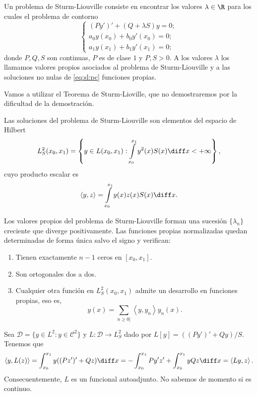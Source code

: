 \documentclass{article}
\begin{document}
\begin{definition}
  Un problema de Sturm-Liouville consiste en encontrar los valores $\lambda \in \R$ para los cuales
  el problema de contorno
  \begin{equation}
    \label{eq:sl:pc}
    \begin{cases}
      (Py')' + (Q + \lambda S) y = 0; \\
      a_0 y(x_0) + b_0 y'(x_0) = 0; \\
      a_1 y(x_1) + b_1 y'(x_1) = 0;
    \end{cases}
    \tag{SL}
  \end{equation}
  donde $P, Q, S$ son continuas, $P$ es de clase $1$ y $P, S > 0$.  A los valores $\lambda$ los
  llamamos valores propios asociados al problema de Sturm-Liouville y a las soluciones no nulas de
  \eqref{eq:sl:pc} funciones propias.
\end{definition}

Vamos a utilizar el Teorema de Sturm-Lioville, que no demostraremos por la dificultad de la
demostración.

Las soluciones del problema de Sturm-Liouville son elementos del espacio de Hilbert
\[L^{2}_S(x_0, x_1) = \left\{y \in L(x_0, x_1): \int\limits_{x_0}^{x_1} y^2(x) S(x) \diff x <
    +\infty\right\},\]
cuyo producto escalar es
\[\left\langle y, z \right\rangle = \int\limits_{x_0}^{x_1} y(x) z(x) S(x) \diff x.\]

\begin{theorem}
  \label{thm:sl}
  Los valores propios del problema de Sturm-Liouville forman una sucesión $\{\lambda_n\}$ creciente
  que diverge positivamente. Las funciones propias normalizadas quedan determinadas de forma única
  salvo el signo y verifican:
  \begin{enumerate}
  \item\label{item:sl:a} Tienen exactamente $n-1$ ceros en $[x_0, x_1]$.
  \item\label{item:sl:b} Son ortogonales dos a dos.
  \item\label{item:sl:c} Cualquier otra función en $L^{2}_S(x_0, x_1)$ admite un desarrollo en
    funciones propias, eso es,
    \[y(x) = \sum\limits_{n \ge 0|} \left\langle y, y_n \right\rangle y_n(x).\]
  \end{enumerate}
\end{theorem}

Sea $\mathcal{D} = \{y \in L^2: y \in \mathcal{C}^{2}\}$ y $L: \mathcal{D} \to L_S^2$ dado por $L[y] = ((Py')' + Q y) / S$. Tenemos que
\[ \left\langle y, L(z) \right\rangle  = \int_{x_0}^{x_1} y((P z')' + Q z) \diff x = -\int_{x_0}^{x_1} Py'z' + \int_{x_0}^{x_1} y Q z \diff x = \left\langle L y, z \right\rangle.\]
Consecuentemente, $L$ es un funcional autoadjunto. No sabemos de momento si es continuo.
\end{document}
